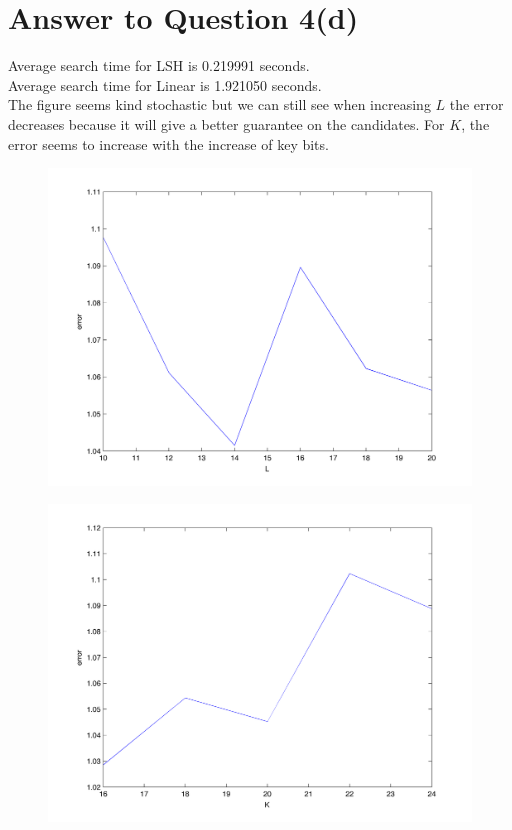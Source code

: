 \documentclass[11pt]{article}
\begin{document}
\pagebreak[4]
\section*{Answer to Question 4(d)}
Average search time for LSH is 0.219991 seconds.\\
Average search time for Linear is 1.921050 seconds.\\

The figure seems kind stochastic but we can still see when increasing $L$ the error decreases
because it will give a better guarantee on the candidates.
For $K$, the error seems to increase with the increase of key bits.
\begin{figure}[h]
\center
\includegraphics[scale=0.5]{L_error.png}
\end{figure}

\begin{figure}[h]
\center
\includegraphics[scale=0.5]{K_error.png}
\end{figure}
\end{document}
